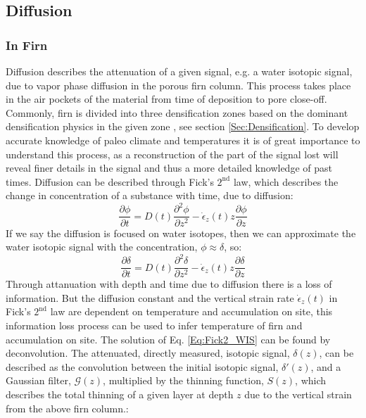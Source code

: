 \documentclass[../../CompleteThesis/Complete_1stDraft.tex]{subfiles}
\begin{document}
\subsection[Diffusion]{Diffusion}
\label{Subsec:Ice_DiffusionAndDensification_Diffusion}

\subsubsection{In Firn}
\label{Subsubsec:Ice_DiffusionAndDensification_Diffusion_Firn}
Diffusion describes the attenuation of a given signal, e.g. a water isotopic signal, due to vapor phase diffusion in the porous firn column. This process takes place in the air pockets of the material from time of deposition to pore close-off. Commonly, firn is divided into three densification zones based on the dominant densification physics in the given zone \cite[Herron and Langway, 1980]{HerronLangway1980}, see section \ref{Sec:Densification}.
To develop accurate knowledge of paleo climate and temperatures it is of great importance to understand this process, as a reconstruction of the part of the signal lost will reveal finer details in the signal and thus a more detailed knowledge of past times. 
Diffusion can be described through Fick's $2^{\text{nd}}$ law, which describes the change in concentration of a substance with time, due to diffusion:
\begin{equation}
	\frac{\partial \phi}{\partial t} = D(t) \frac{\partial^2 \phi}{\partial z^2} - \dot{\epsilon}_z(t) z \frac{\partial \phi}{\partial z}
	\label{Eq:Fick2_concentration}
\end{equation}
If we say the diffusion is focused on water isotopes, then we can approximate the water isotopic signal with the concentration, $\phi \approx \delta$, so:
\begin{equation}
	\frac{\partial \delta}{\partial t} = D(t) \frac{\partial^2 \delta}{\partial z^2} - \dot{\epsilon}_z(t) z \frac{\partial \delta}{\partial z}
	\label{Eq:Fick2_WIS}
\end{equation}
Through attanuation with depth and time due to diffusion there is a loss of information. But the diffusion constant and the vertical strain rate $\dot{\epsilon}_z(t)$ in Fick's $2^{\text{nd}}$ law are dependent on temperature and accumulation on site, this information loss process can be used to infer temperature of firn and accumulation on site. 
The solution of Eq. \ref{Eq:Fick2_WIS} can be found by deconvolution. The attenuated, directly measured, isotopic signal, $\delta(z)$, can be described as the convolution between the initial isotopic signal, $\delta '(z)$, and a Gaussian filter, $\mathcal{G}(z)$, multiplied by the thinning function, $S(z)$, which describes the total thinning of a given layer at depth $z$ due to the vertical strain from the above firn column.:
\end{document}
